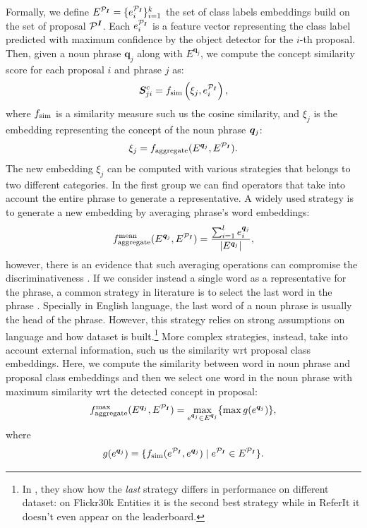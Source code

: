 Formally, we define $E^{\mathcal{P}_{\bm{I}}} = \{e^{\mathcal{P}_{\bm{I}}}_i \}^{k}_{i=1}$ the set of class
labels embeddings build on the set of proposal $\mathcal{P}^{\bm{I}}$. Each
$e^{\mathcal{P}_{\bm{I}}}_i$ is a feature vector representing the class label predicted
with maximum confidence by the object detector for the $i$-th
proposal. Then, given a noun phrase $\bm{q}_j$ along with
$E^{\bm{q}_j}$, we compute the concept similarity score for each
proposal $i$ and phrase $j$ as:
\begin{equation}
  \bm{S}^c_{ji} = f_{\text{sim}} \left( \xi_j, e^{\mathcal{P}_{\bm{I}}}_i \right),
\end{equation}
where $f_{\text{sim}}$ is a similarity measure such us the cosine similarity,
and $\xi_j$ is the embedding representing the concept of the noun phrase
$\bm{q}_j$:
\begin{equation}
  \xi_j = f_{\text{aggregate}}(E^{\bm{q}_j}, E^{\mathcal{P}_{\bm{I}}}).
\end{equation}
The new embedding $\xi_j$ can be computed with various strategies that
belongs to two different categories. In the first group we can find
operators that take into account the entire phrase to generate a
representative. A widely used strategy is to generate a new embedding
by averaging phrase's word embeddings:
\begin{equation}
  f_{\text{aggregate}}^{\text{mean}}(E^{\bm{q}_j}, E^{\mathcal{P}_{\bm{I}}}) = \frac{\sum^l_{i=1} e^{\bm{q}_j}_i}{| E^{\bm{q}_j} |},
\end{equation}
however, there is an evidence that such averaging operations can
compromise the discriminativeness
\cite{wang2019phrase,datta2019align2ground}. If we consider instead a
single word as a representative for the phrase, a common strategy in
literature is to select the last word in the phrase
\cite{wang2019phrase}. Specially in English language, the last word of
a noun phrase is usually the head of the phrase. However, this
strategy relies on strong assumptions on language and how dataset is
built.\footnote{In \cite{wang2019phrase}, they show how the
\textit{last} strategy differs in performance on different dataset: on
Flickr30k Entities it is the second best strategy while in ReferIt it
doesn't even appear on the leaderboard.} More complex strategies,
instead, take into account external information, such us the
similarity wrt proposal class embeddings. Here, we compute the
similarity between word in noun phrase and proposal class embeddings
and then we select one word in the noun phrase with maximum similarity
wrt the detected concept in proposal:
\begin{equation}
  f_{\text{aggregate}}^{\text{max}}(E^{\bm{q}_j}, E^{\mathcal{P}_{\bm{I}}}) = \max_{e^{\bm{q}_j} \in E^{\bm{q}_j}} \{ \max g(e^{\bm{q}_j}) \},
\end{equation}
where
\begin{equation}
  g(e^{\bm{q}_j}) = \{ f_{\text{sim}}(e^{\mathcal{P}_{\bm{I}}}, e^{\bm{q}_j}) \mid e^{\mathcal{P}_{\bm{I}}} \in E^{\mathcal{P}_{\bm{I}}} \}.
\end{equation}

